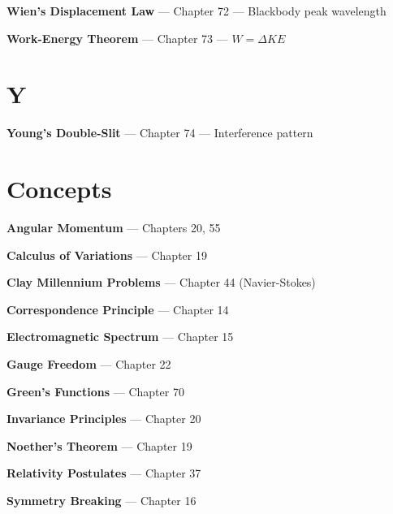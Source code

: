 \textbf{Wien's Displacement Law} --- Chapter 72 --- Blackbody peak wavelength

\textbf{Work-Energy Theorem} --- Chapter 73 --- $W = \Delta KE$

\section*{Y}

\textbf{Young's Double-Slit} --- Chapter 74 --- Interference pattern

\section*{Concepts}

\textbf{Angular Momentum} --- Chapters 20, 55

\textbf{Calculus of Variations} --- Chapter 19

\textbf{Clay Millennium Problems} --- Chapter 44 (Navier-Stokes)

\textbf{Correspondence Principle} --- Chapter 14

\textbf{Electromagnetic Spectrum} --- Chapter 15

\textbf{Gauge Freedom} --- Chapter 22

\textbf{Green's Functions} --- Chapter 70

\textbf{Invariance Principles} --- Chapter 20

\textbf{Noether's Theorem} --- Chapter 19

\textbf{Relativity Postulates} --- Chapter 37

\textbf{Symmetry Breaking} --- Chapter 16
